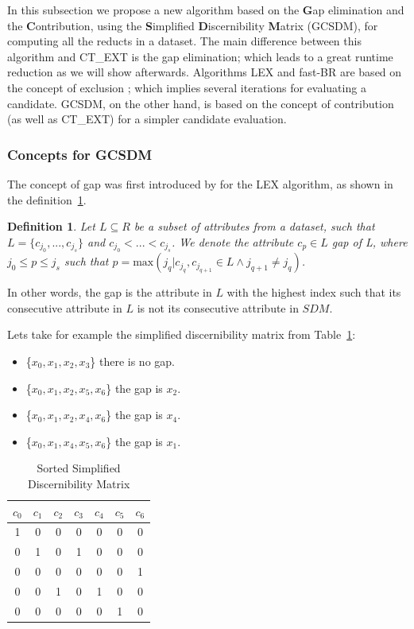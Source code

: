 \documentclass[authoryear,11pt]{elsarticle}
\newtheorem{definition}{Definition}
\begin{document}
	In this subsection we propose a new algorithm based on the \textbf{G}ap elimination and the
	\textbf{C}ontribution, using the \textbf{S}implified \textbf{D}iscernibility \textbf{M}atrix (GCSDM), for
	computing all the reducts in a dataset. The main difference between this algorithm and CT\_EXT is the
	gap elimination; which leads to a great runtime reduction as we will show afterwards. Algorithms LEX and
	fast-BR are based on the concept of exclusion \citep{Lias13}; which implies several iterations for evaluating 
	a candidate. GCSDM, on the other hand, is based on the concept of contribution (as well as CT\_EXT) for a 
	simpler candidate evaluation.

\subsubsection{Concepts for GCSDM}

	The concept of gap was first introduced by \cite{Santiesteban03} for the LEX algorithm, as shown in the
	definition~\ref{def:gap}.
	
	\begin{definition}\label{def:gap}
		Let $L \subseteq R$ be a subset of attributes from a dataset, such that $L = \lbrace c_{j_0},...,c_{j_s}
		\rbrace$ and $c_{j_0}<...<c_{j_s}$. We denote the attribute $c_p \in L$ gap of L, where $j_0 \leq p \leq
		j_s$ such that $p=\mathrm{max}(j_q | c_{j_q},c_{j_{q+1}} \in L \wedge j_{q+1} \neq j_q)$.
	\end{definition}
	
	In other words, the gap is the attribute in $L$ with the highest index such that its consecutive attribute in 
	$L$ is not its consecutive attribute in $SDM$.
	
	Lets take for example the simplified discernibility matrix from Table~\ref{tab:SDM1}:
	\begin{itemize}
	\item \{$x_0,x_1,x_2,x_3$\} there is no gap.
	\item \{$x_0,x_1,x_2,x_5,x_6$\} the gap is $x_2$.
	\item \{$x_0,x_1,x_2,x_4,x_6$\} the gap is $x_4$.
	\item \{$x_0,x_1,x_4,x_5,x_6$\} the gap is $x_1$.
	\end{itemize}
	
	\begin{table}[!htb]
      \centering
        \caption{Sorted Simplified Discernibility Matrix}
        \begin{tabular}{ccccccc}\label{tab:SDM1}
            $c_0$ & $c_1$ & $c_2$ & $c_3$ & $c_4$ & $c_5$ & $c_6$\\
        		\hline
        		1&0&0&0&0&0&0\\
        		0&1&0&1&0&0&0\\
        		0&0&0&0&0&0&1\\
        		0&0&1&0&1&0&0\\
        		0&0&0&0&0&1&0\\
        \end{tabular} 
	\end{table}
	
\end{document}
